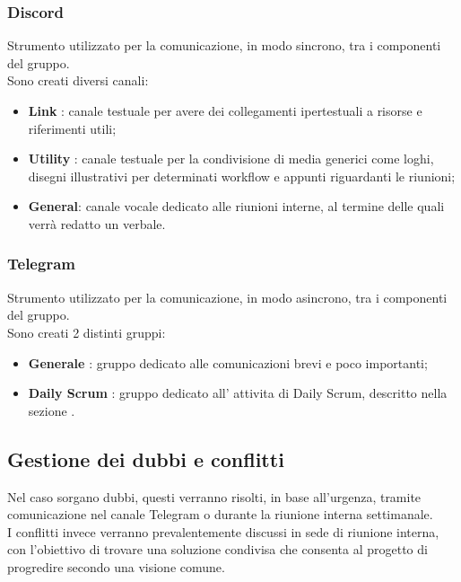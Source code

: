         \subsubsection{Discord}
        Strumento utilizzato per la comunicazione, in modo sincrono, tra i componenti del gruppo.\\
        Sono creati diversi canali:
        \begin{itemize}
            \item \textbf{Link} : canale testuale per avere dei collegamenti ipertestuali a risorse e riferimenti utili;
            \item \textbf{Utility} : canale testuale per la condivisione di media generici come loghi, disegni illustrativi per determinati workflow e appunti riguardanti le riunioni;
            \item \textbf{General}: canale vocale dedicato alle riunioni interne, al termine delle quali verrà redatto un verbale.
        \end{itemize}

        \subsubsection{Telegram}
        Strumento utilizzato per la comunicazione, in modo asincrono, tra i componenti del gruppo.\\
        Sono creati 2 distinti gruppi:
        \begin{itemize}
            \item \textbf{Generale} : gruppo dedicato alle comunicazioni brevi e poco importanti;
            \item \textbf{Daily Scrum} : gruppo dedicato all' attivita di Daily Scrum, descritto nella sezione .
        \end{itemize}

    \subsection{Gestione dei dubbi e conflitti}
        Nel caso sorgano dubbi, questi verranno risolti, in base all'urgenza, 
        tramite comunicazione nel canale Telegram o durante la riunione interna 
        settimanale. \\
        I conflitti invece verranno prevalentemente discussi in sede di riunione 
        interna, con l'obiettivo di trovare una soluzione condivisa che consenta 
        al progetto di progredire secondo una visione comune.